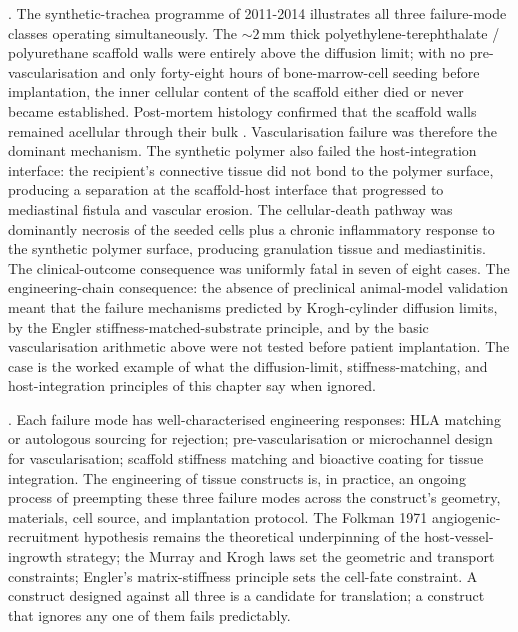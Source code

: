 . The
synthetic-trachea programme of 2011-2014
\cite{acc:macchiarini-trachea-2008-2014} illustrates all three
failure-mode classes operating simultaneously. The
$\sim 2\,\text{mm}$ thick polyethylene-terephthalate / polyurethane
scaffold walls were entirely above the diffusion limit; with no
pre-vascularisation and only forty-eight hours of bone-marrow-cell
seeding before implantation, the inner cellular content of the
scaffold either died or never became established. Post-mortem
histology confirmed that the scaffold walls remained acellular
through their bulk \cite{paper:v6c05-karolinska-heckscher-2018,
paper:v6c05-delaere-2014-thorax}. Vascularisation failure was
therefore the dominant mechanism. The synthetic polymer also failed
the host-integration interface: the recipient's connective tissue
did not bond to the polymer surface, producing a separation at the
scaffold-host interface that progressed to mediastinal fistula and
vascular erosion. The cellular-death pathway was dominantly necrosis
of the seeded cells plus a chronic inflammatory response to the
synthetic polymer surface, producing granulation tissue and
mediastinitis. The clinical-outcome consequence was uniformly fatal
in seven of eight cases. The engineering-chain consequence:
the absence of preclinical animal-model validation meant that the
failure mechanisms predicted by Krogh-cylinder diffusion limits, by
the Engler stiffness-matched-substrate principle, and by the basic
vascularisation arithmetic above were not tested before patient
implantation. The case is the worked example of what the
diffusion-limit, stiffness-matching, and host-integration
principles of this chapter say when ignored.

. Each failure mode has well-characterised
engineering responses: HLA matching or autologous sourcing for
rejection; pre-vascularisation or microchannel design for
vascularisation; scaffold stiffness matching and bioactive coating
for tissue integration. The engineering of tissue constructs is, in
practice, an ongoing process of preempting these three failure modes
across the construct's geometry, materials, cell source, and
implantation protocol. The Folkman 1971 angiogenic-recruitment
hypothesis \cite{paper:v6c05-folkman-1973-tumour-angiogenesis}
remains the theoretical underpinning of the host-vessel-ingrowth
strategy; the Murray and Krogh laws set the geometric and transport
constraints; Engler's matrix-stiffness principle sets the
cell-fate constraint. A construct designed against all three is a
candidate for translation; a construct that ignores any one of them
fails predictably.

